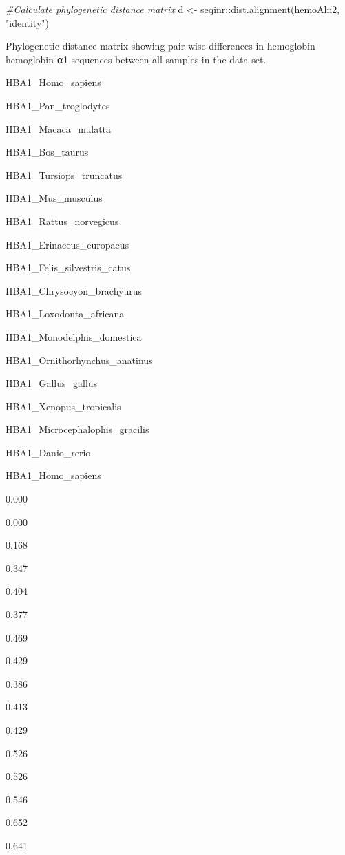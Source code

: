 \documentclass[
]{book}
\newenvironment{Shaded}{\begin{snugshade}}{\end{snugshade}}
\newcommand{\CommentTok}[1]{\textcolor[rgb]{0.56,0.35,0.01}{\textit{#1}}}
\newcommand{\FunctionTok}[1]{\textcolor[rgb]{0.00,0.00,0.00}{#1}}
\newcommand{\NormalTok}[1]{#1}
\newcommand{\OtherTok}[1]{\textcolor[rgb]{0.56,0.35,0.01}{#1}}
\newcommand{\SpecialCharTok}[1]{\textcolor[rgb]{0.00,0.00,0.00}{#1}}
\newcommand{\StringTok}[1]{\textcolor[rgb]{0.31,0.60,0.02}{#1}}
\begin{document}
\begin{Shaded}
\begin{Highlighting}[]
\CommentTok{\#Calculate phylogenetic distance matrix}
\NormalTok{d }\OtherTok{\textless{}{-}}\NormalTok{ seqinr}\SpecialCharTok{::}\FunctionTok{dist.alignment}\NormalTok{(hemoAln2, }\StringTok{"identity"}\NormalTok{)}
\end{Highlighting}
\end{Shaded}

\label{tab:unnamed-chunk-5}Phylogenetic distance matrix showing pair-wise differences in hemoglobin hemoglobin ⍺1 sequences between all samples in the data set.

HBA1\_Homo\_sapiens

HBA1\_Pan\_troglodytes

HBA1\_Macaca\_mulatta

HBA1\_Bos\_taurus

HBA1\_Tursiops\_truncatus

HBA1\_Mus\_musculus

HBA1\_Rattus\_norvegicus

HBA1\_Erinaceus\_europaeus

HBA1\_Felis\_silvestris\_catus

HBA1\_Chrysocyon\_brachyurus

HBA1\_Loxodonta\_africana

HBA1\_Monodelphis\_domestica

HBA1\_Ornithorhynchus\_anatinus

HBA1\_Gallus\_gallus

HBA1\_Xenopus\_tropicalis

HBA1\_Microcephalophis\_gracilis

HBA1\_Danio\_rerio

HBA1\_Homo\_sapiens

0.000

0.000

0.168

0.347

0.404

0.377

0.469

0.429

0.386

0.413

0.429

0.526

0.526

0.546

0.652

0.641
\end{document}
